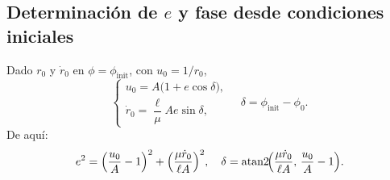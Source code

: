 \documentclass{article}
\begin{document}
\subsection*{Determinación de \(e\) y fase desde condiciones iniciales}
Dado \(r_0\) y \(\dot r_0\) en \(\phi=\phi_{\mathrm{init}}\), con \(u_0=1/r_0\),
\[
\begin{cases}
u_0 = A\bigl(1 + e\cos\delta\bigr),\\[4pt]
\dot r_0 = \dfrac{\ell}{\mu}A e\sin\delta,
\end{cases}
\quad \delta = \phi_{\mathrm{init}} - \phi_0.
\]
De aquí:
\[
e^2 = \Bigl(\frac{u_0}{A}-1\Bigr)^2 + \Bigl(\frac{\mu\dot r_0}{\ell A}\Bigr)^2,
\quad
\delta = \operatorname{atan2}\!\Bigl(\frac{\mu\dot r_0}{\ell A},\,\frac{u_0}{A}-1\Bigr).
\]
\end{document}

